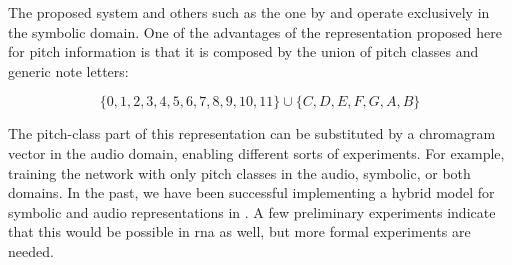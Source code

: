 
The proposed system and others such as the one by
\textcite{micchi2021deep} and \textcite{mcleod2021modular}
operate exclusively in the symbolic domain. One of the
advantages of the representation proposed here for pitch
information is that it is composed by the union of pitch
classes and generic note letters:

\begin{equation}
    \{0, 1, 2, 3, 4, 5, 6, 7, 8, 9, 10, 11\} \cup \{C, D, E, F, G, A, B\}
\end{equation}

The pitch-class part of this representation can be
substituted by a chromagram vector in the audio domain,
enabling different sorts of experiments. For example,
training the network with only pitch classes in the audio,
symbolic, or both domains. In the past, we have been
successful implementing a hybrid model for symbolic and
audio representations in \textcite{napoleslopez2019effects}.
A few preliminary experiments indicate that this would be
possible in \gls{rna} as well, but more formal experiments
are needed.
